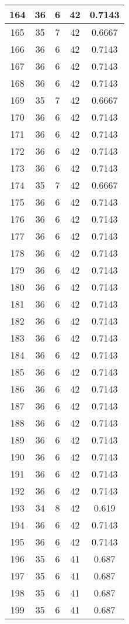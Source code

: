\documentclass[letterpaper, 12pt]{article}
\begin{document}
\begin{longtable}{|c|c|c|c|c|}
\hline
164 & 36 & 6 & 42 & 0.7143 \\
\hline
165 & 35 & 7 & 42 & 0.6667 \\
\hline
166 & 36 & 6 & 42 & 0.7143 \\
\hline
167 & 36 & 6 & 42 & 0.7143 \\
\hline
168 & 36 & 6 & 42 & 0.7143 \\
\hline
169 & 35 & 7 & 42 & 0.6667 \\
\hline
170 & 36 & 6 & 42 & 0.7143 \\
\hline
171 & 36 & 6 & 42 & 0.7143 \\
\hline
172 & 36 & 6 & 42 & 0.7143 \\
\hline
173 & 36 & 6 & 42 & 0.7143 \\
\hline
174 & 35 & 7 & 42 & 0.6667 \\
\hline
175 & 36 & 6 & 42 & 0.7143 \\
\hline
176 & 36 & 6 & 42 & 0.7143 \\
\hline
177 & 36 & 6 & 42 & 0.7143 \\
\hline
178 & 36 & 6 & 42 & 0.7143 \\
\hline
179 & 36 & 6 & 42 & 0.7143 \\
\hline
180 & 36 & 6 & 42 & 0.7143 \\
\hline
181 & 36 & 6 & 42 & 0.7143 \\
\hline
182 & 36 & 6 & 42 & 0.7143 \\
\hline
183 & 36 & 6 & 42 & 0.7143 \\
\hline
184 & 36 & 6 & 42 & 0.7143 \\
\hline
185 & 36 & 6 & 42 & 0.7143 \\
\hline
186 & 36 & 6 & 42 & 0.7143 \\
\hline
187 & 36 & 6 & 42 & 0.7143 \\
\hline
188 & 36 & 6 & 42 & 0.7143 \\
\hline
189 & 36 & 6 & 42 & 0.7143 \\
\hline
190 & 36 & 6 & 42 & 0.7143 \\
\hline
191 & 36 & 6 & 42 & 0.7143 \\
\hline
192 & 36 & 6 & 42 & 0.7143 \\
\hline
193 & 34 & 8 & 42 & 0.619 \\
\hline
194 & 36 & 6 & 42 & 0.7143 \\
\hline
195 & 36 & 6 & 42 & 0.7143 \\
\hline
196 & 35 & 6 & 41 & 0.687 \\
\hline
197 & 35 & 6 & 41 & 0.687 \\
\hline
198 & 35 & 6 & 41 & 0.687 \\
\hline
199 & 35 & 6 & 41 & 0.687 \\
\hline
\end{longtable}
\end{document}

